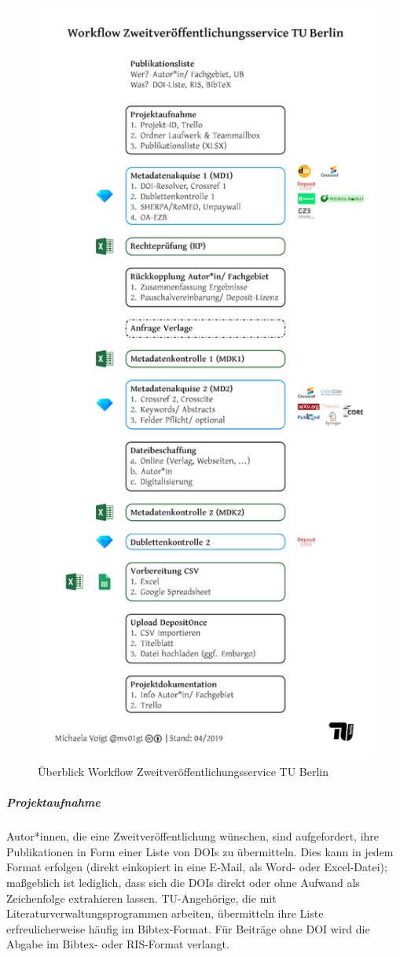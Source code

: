 \documentclass[a4paper,
fontsize=11pt,
oneside,
numbers=noperiodatend,
parskip=half-,
bibliography=totoc,
final
]{scrartcl}
\begin{document}
\begin{figure}
\centering
\includegraphics[width=9.3 cm]{img/fig1.png}
\caption{Überblick Workflow Zweitveröffentlichungsservice TU Berlin}
\end{figure}

\hypertarget{projektaufnahme}{%
\subparagraph{Projektaufnahme}\label{projektaufnahme}}

Autor*innen, die eine Zweitveröffentlichung wünschen, sind aufgefordert,
ihre Publikationen in Form einer Liste von DOIs zu übermitteln. Dies
kann in jedem Format erfolgen (direkt einkopiert in eine E-Mail, als
Word- oder Excel-Datei); maßgeblich ist lediglich, dass sich die DOIs
direkt oder ohne Aufwand als Zeichenfolge extrahieren lassen.
TU-Angehörige, die mit Literaturverwaltungsprogrammen arbeiten,
übermitteln ihre Liste erfreulicherweise häufig im Bibtex-Format. Für
Beiträge ohne DOI wird die Abgabe im Bibtex- oder RIS-Format verlangt.
\end{document}
